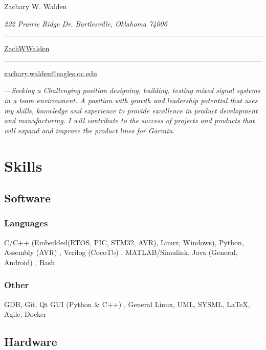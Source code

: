\documentclass{article}
\newcommand\mybar{\kern1pt\rule[-\dp\strutbox]{.8pt}{\baselineskip}\kern1pt}
\begin{document}
\begin{center}
	\begin{Huge}
		Zachary W. Walden\\
	\end{Huge}
	\begin{large}
		\textsl{222 Prairie Ridge Dr. Bartlesville, Oklahoma 74006}\\
	\end{large}
	\begin{normalsize}
		 \mybar { } \faGithub \href{https://github.com/ZachWWalden}{ ZachWWalden}
		\mybar { }\faEnvelope\href{mailto::zachary.walden@eagles.oc.edu}{ zachary.walden@eagles.oc.edu}
	\end{normalsize}
\end{center}
\begin{spacing}{.5}

\begin{adjustwidth}{30pt}{30pt}
	\textit{\large{---Seeking a Challenging position designing, building, testing mixed signal systems in a team environment.  A position with growth and leadership potential that uses my skills, knowledge and experience to provide excellence in product development and manufacturing.
	I will contribute to the success of projects and products that will expand and improve the product lines for Garmin.}}
\end{adjustwidth}

\section{Skills}
	\subsection{Software}
		\subsubsection{Languages} \large{C/C++} \small{(Embedded(RTOS, PIC, STM32, AVR), Linux, Windows)}\large{, Python, Assembly} \small{(AVR)} \large{, Verilog} \small{(CocoTb)} \large{, MATLAB/Simulink, Java} \small{(General, Android)} \large{, Bash}
		\subsubsection{Other} \large{GDB, Git, Qt GUI} \small{(Python \& C++)} \large{, General Linux, UML, SYSML, \LaTeX, Agile, Docker}
	\subsection{Hardware}

\end{spacing}
\end{document}
